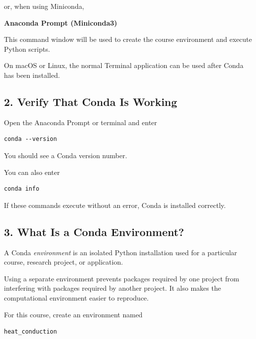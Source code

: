 \documentclass[11pt]{article}
\begin{document}
or, when using Miniconda,

\begin{center}
\textbf{Anaconda Prompt (Miniconda3)}
\end{center}

This command window will be used to create the course environment and
execute Python scripts.

On macOS or Linux, the normal Terminal application can be used after
Conda has been installed.

\subsection*{2. Verify That Conda Is Working}

Open the Anaconda Prompt or terminal and enter

\begin{lstlisting}
conda --version
\end{lstlisting}

You should see a Conda version number.

You can also enter

\begin{lstlisting}
conda info
\end{lstlisting}

If these commands execute without an error, Conda is installed correctly.

\subsection*{3. What Is a Conda Environment?}

A Conda \textit{environment} is an isolated Python installation used for
a particular course, research project, or application.

Using a separate environment prevents packages required by one project
from interfering with packages required by another project. It also
makes the computational environment easier to reproduce.

For this course, create an environment named

\begin{center}
\texttt{heat\_conduction}
\end{center}
\end{document}
